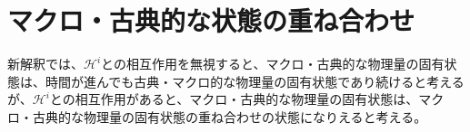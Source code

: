 \section{マクロ・古典的な状態の重ね合わせ}
新解釈では、$\mathcal{H}^i$との相互作用を無視すると、マクロ・古典的な物理量の固有状態は、時間が進んでも古典・マクロ的な物理量の固有状態であり続けると考えるが、$\mathcal{H}^i$との相互作用があると、マクロ・古典的な物理量の固有状態は、マクロ・古典的な物理量の固有状態の重ね合わせの状態になりえると考える。